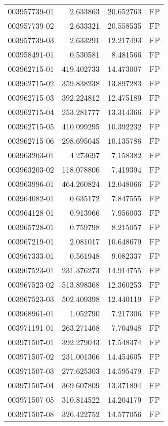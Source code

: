 \begin{tabular}{lrrl}
003957739-01 &    2.633863 &    20.652763 &   FP \\
003957739-02 &    2.633321 &    20.558535 &   FP \\
003957739-03 &    2.633291 &    12.217493 &   FP \\
003958491-01 &    0.530581 &     8.481566 &   FP \\
003962715-01 &  419.402733 &    14.473007 &   FP \\
003962715-02 &  359.838238 &    13.897283 &   FP \\
003962715-03 &  392.224812 &    12.475189 &   FP \\
003962715-04 &  253.281777 &    13.314366 &   FP \\
003962715-05 &  410.099295 &    10.392232 &   FP \\
003962715-06 &  298.695045 &    10.135786 &   FP \\
003963203-01 &    4.273697 &     7.158382 &   FP \\
003963203-02 &  118.078806 &     7.419394 &   FP \\
003963996-01 &  464.260824 &    12.048066 &   FP \\
003964082-01 &    0.635172 &     7.847555 &   FP \\
003964128-01 &    0.913966 &     7.956003 &   FP \\
003965728-01 &    0.759798 &     8.215057 &   FP \\
003967219-01 &    2.081017 &    10.648679 &   FP \\
003967333-01 &    0.561948 &     9.082337 &   FP \\
003967523-01 &  231.376273 &    14.914755 &   FP \\
003967523-02 &  513.898368 &    12.360253 &   FP \\
003967523-03 &  502.409398 &    12.440119 &   FP \\
003968961-01 &    1.052790 &     7.217306 &   FP \\
003971191-01 &  263.271468 &     7.704948 &   FP \\
003971507-01 &  392.279043 &    17.548374 &   FP \\
003971507-02 &  231.001366 &    14.454605 &   FP \\
003971507-03 &  277.625303 &    14.595479 &   FP \\
003971507-04 &  369.607809 &    13.371894 &   FP \\
003971507-05 &  310.814522 &    14.204179 &   FP \\
003971507-08 &  326.422752 &    14.577056 &   FP \\

\end{tabular}
